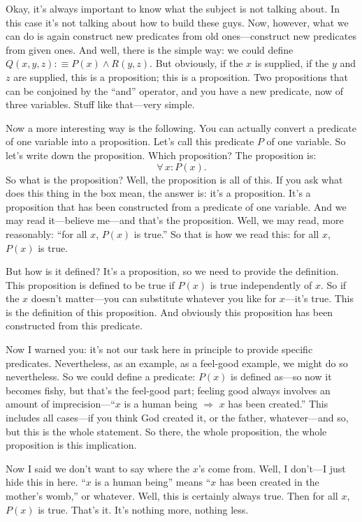 Okay, it's always important to know what the subject is not talking about. In this case it's not talking about how to build these guys. Now, however, what we can do is again construct new predicates from old ones---construct new predicates from given ones. And well, there is the simple way: we could define $Q(x, y, z) :\equiv P(x) \land R(y, z)$. But obviously, if the $x$ is supplied, if the $y$ and $z$ are supplied, this is a proposition; this is a proposition. Two propositions that can be conjoined by the ``and'' operator, and you have a new predicate, now of three variables. Stuff like that---very simple.

Now a more interesting way is the following. You can actually convert a predicate of one variable into a proposition. Let's call this predicate $P$ of one variable. So let's write down the proposition. Which proposition? The proposition is:
\[
\forall\, x : P(x).
\]
So what is the proposition? Well, the proposition is all of this. If you ask what does this thing in the box mean, the answer is: it's a proposition. It's a proposition that has been constructed from a predicate of one variable. And we may read it---believe me---and that's the proposition. Well, we may read, more reasonably: ``for all $x$, $P(x)$ is true.'' So that is how we read this: for all $x$, $P(x)$ is true.

But how is it defined? It's a proposition, so we need to provide the definition. This proposition is defined to be true if $P(x)$ is true independently of $x$. So if the $x$ doesn't matter---you can substitute whatever you like for $x$---it's true. This is the definition of this proposition. And obviously this proposition has been constructed from this predicate.

Now I warned you: it's not our task here in principle to provide specific predicates. Nevertheless, as an example, as a feel-good example, we might do so nevertheless. So we could define a predicate: $P(x)$ is defined as---so now it becomes fishy, but that's the feel-good part; feeling good always involves an amount of imprecision---``$x$ is a human being $\Rightarrow$ $x$ has been created.'' This includes all cases---if you think God created it, or the father, whatever---and so, but this is the whole statement. So there, the whole proposition, the whole proposition is this implication.

Now I said we don't want to say where the $x$'s come from. Well, I don't---I just hide this in here. ``$x$ is a human being'' means ``$x$ has been created in the mother's womb,'' or whatever. Well, this is certainly always true. Then for all $x$, $P(x)$ is true. That's it. It's nothing more, nothing less.

